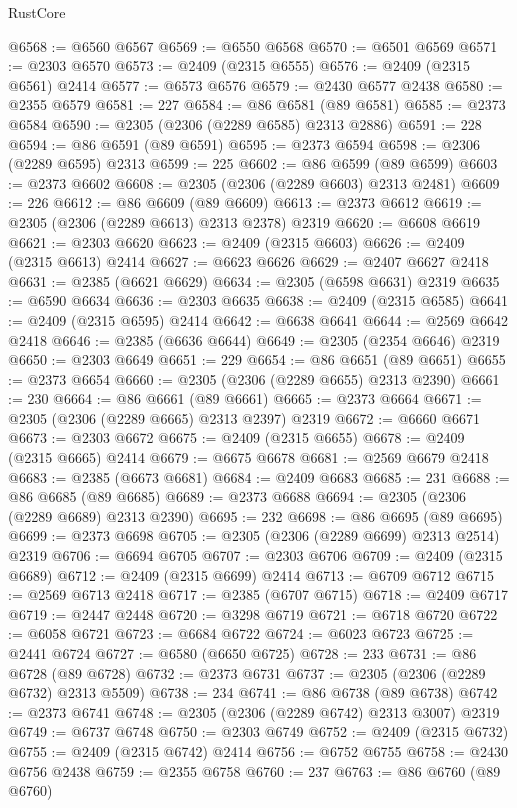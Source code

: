 \begin{lexlean}{RustCore}
\begin{coremodule}
@6568 := @6560 @6567
@6569 := @6550 @6568
@6570 := @6501 @6569
@6571 := @2303 @6570
@6573 := @2409 (@2315 @6555)
@6576 := @2409 (@2315 @6561) @2414
@6577 := @6573 @6576
@6579 := @2430 @6577 @2438
@6580 := @2355 @6579
@6581 := 227
@6584 := @86 @6581 (@89 @6581)
@6585 := @2373 @6584
@6590 := @2305 (@2306 (@2289 @6585) @2313 @2886)
@6591 := 228
@6594 := @86 @6591 (@89 @6591)
@6595 := @2373 @6594
@6598 := @2306 (@2289 @6595) @2313
@6599 := 225
@6602 := @86 @6599 (@89 @6599)
@6603 := @2373 @6602
@6608 := @2305 (@2306 (@2289 @6603) @2313 @2481)
@6609 := 226
@6612 := @86 @6609 (@89 @6609)
@6613 := @2373 @6612
@6619 := @2305 (@2306 (@2289 @6613) @2313 @2378) @2319
@6620 := @6608 @6619
@6621 := @2303 @6620
@6623 := @2409 (@2315 @6603)
@6626 := @2409 (@2315 @6613) @2414
@6627 := @6623 @6626
@6629 := @2407 @6627 @2418
@6631 := @2385 (@6621 @6629)
@6634 := @2305 (@6598 @6631) @2319
@6635 := @6590 @6634
@6636 := @2303 @6635
@6638 := @2409 (@2315 @6585)
@6641 := @2409 (@2315 @6595) @2414
@6642 := @6638 @6641
@6644 := @2569 @6642 @2418
@6646 := @2385 (@6636 @6644)
@6649 := @2305 (@2354 @6646) @2319
@6650 := @2303 @6649
@6651 := 229
@6654 := @86 @6651 (@89 @6651)
@6655 := @2373 @6654
@6660 := @2305 (@2306 (@2289 @6655) @2313 @2390)
@6661 := 230
@6664 := @86 @6661 (@89 @6661)
@6665 := @2373 @6664
@6671 := @2305 (@2306 (@2289 @6665) @2313 @2397) @2319
@6672 := @6660 @6671
@6673 := @2303 @6672
@6675 := @2409 (@2315 @6655)
@6678 := @2409 (@2315 @6665) @2414
@6679 := @6675 @6678
@6681 := @2569 @6679 @2418
@6683 := @2385 (@6673 @6681)
@6684 := @2409 @6683
@6685 := 231
@6688 := @86 @6685 (@89 @6685)
@6689 := @2373 @6688
@6694 := @2305 (@2306 (@2289 @6689) @2313 @2390)
@6695 := 232
@6698 := @86 @6695 (@89 @6695)
@6699 := @2373 @6698
@6705 := @2305 (@2306 (@2289 @6699) @2313 @2514) @2319
@6706 := @6694 @6705
@6707 := @2303 @6706
@6709 := @2409 (@2315 @6689)
@6712 := @2409 (@2315 @6699) @2414
@6713 := @6709 @6712
@6715 := @2569 @6713 @2418
@6717 := @2385 (@6707 @6715)
@6718 := @2409 @6717
@6719 := @2447 @2448
@6720 := @3298 @6719
@6721 := @6718 @6720
@6722 := @6058 @6721
@6723 := @6684 @6722
@6724 := @6023 @6723
@6725 := @2441 @6724
@6727 := @6580 (@6650 @6725)
@6728 := 233
@6731 := @86 @6728 (@89 @6728)
@6732 := @2373 @6731
@6737 := @2305 (@2306 (@2289 @6732) @2313 @5509)
@6738 := 234
@6741 := @86 @6738 (@89 @6738)
@6742 := @2373 @6741
@6748 := @2305 (@2306 (@2289 @6742) @2313 @3007) @2319
@6749 := @6737 @6748
@6750 := @2303 @6749
@6752 := @2409 (@2315 @6732)
@6755 := @2409 (@2315 @6742) @2414
@6756 := @6752 @6755
@6758 := @2430 @6756 @2438
@6759 := @2355 @6758
@6760 := 237
@6763 := @86 @6760 (@89 @6760)

\end{coremodule}
\end{lexlean}
